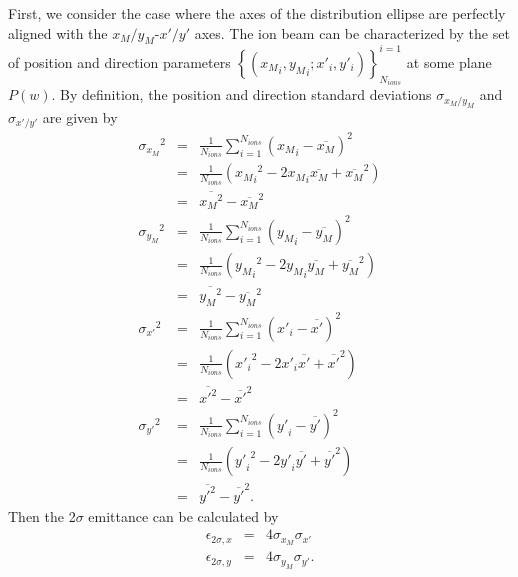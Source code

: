 \documentclass{article}
\begin{document}
First, we consider the case where the axes of the distribution ellipse are perfectly aligned with the $x_M/y_M$-$x'/y'$ axes. The ion beam can be characterized by the set of position and direction parameters $\left\{ \left({x_{M}}_i,{y_{M}}_i; x'_i,y'_i \right)\right\}^{i=1}_{N_{ions}}$ at some plane $P(w)$. By definition, the position and direction standard deviations $\sigma_{x_M/y_M}$ and $\sigma_{x'/y'}$ are given by
\begin{eqnarray*}
{\sigma_{x_M}}^2 & = & \frac{1}{N_{ions}} \sum_{i=1}^{N_{ions}} ({x_M}_i - \overline{x_M})^2 \\
& = & \frac{1}{N_{ions}} \left( {{x_M}_i}^2 - 2 {x_M}_i \overline{x_M} + \overline{x_M}^2 \right) \\
& = & \overline{{x_M}^2} - \overline{{x_M}}^2 \\
{\sigma_{y_M}}^2 & = & \frac{1}{N_{ions}} \sum_{i=1}^{N_{ions}} ({y_M}_i - \overline{y_M})^2 \\
& = & \frac{1}{N_{ions}} \left( {{y_M}_i}^2 - 2 {y_M}_i \overline{y_M} + \overline{y_M}^2 \right) \\
& = & \overline{{y_M}^2} - \overline{{y_M}}^2 \\
{\sigma_{x'}}^2 & = & \frac{1}{N_{ions}} \sum_{i=1}^{N_{ions}} ({x'}_i - \overline{x'})^2 \\
& = & \frac{1}{N_{ions}} \left( {{x'}_i}^2 - 2 {x'}_i \overline{x'} + \overline{x'}^2 \right) \\
& = & \overline{{x'}^2} - \overline{{x'}}^2 \\
{\sigma_{y'}}^2 & = & \frac{1}{N_{ions}} \sum_{i=1}^{N_{ions}} ({y'}_i - \overline{y'})^2 \\
& = & \frac{1}{N_{ions}} \left( {{y'}_i}^2 - 2 {y'}_i \overline{y'} + \overline{y'}^2 \right) \\
& = & \overline{{y'}^2} - \overline{{y'}}^2 .
\end{eqnarray*}
Then the 2$\sigma$ emittance can be calculated by
\begin{eqnarray*}
\epsilon_{2\sigma,x} & = & 4 \sigma_{x_M} \sigma_{x'} \\
\epsilon_{2\sigma,y} & = & 4 \sigma_{y_M} \sigma_{y'}. \\
\end{eqnarray*}
\end{document}
